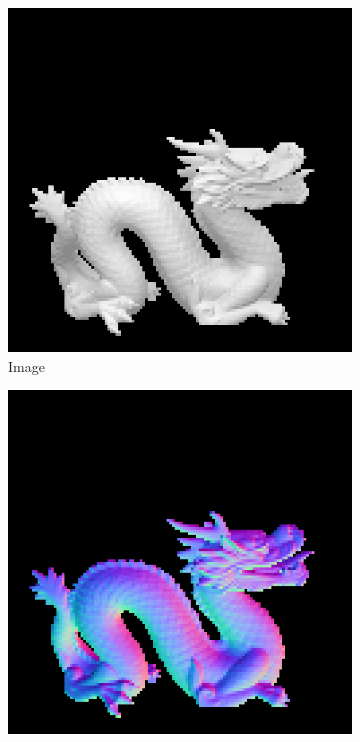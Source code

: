 \begin{figure}[H]
	\centering
	\captionsetup{width=\linewidth}
	\begin{subfigure}[b]{0.24\linewidth}
		\includegraphics[width=\linewidth]{./Figures/gcnn_synthetic/fancy_eval_7_img.png}
		\caption{Image}
	\end{subfigure}
	\begin{subfigure}[b]{0.24\linewidth}
		\includegraphics[width=\linewidth]{./Figures/gcnn_synthetic/fancy_eval_7_groundtruth.png}

\end{subfigure}
\end{figure}
